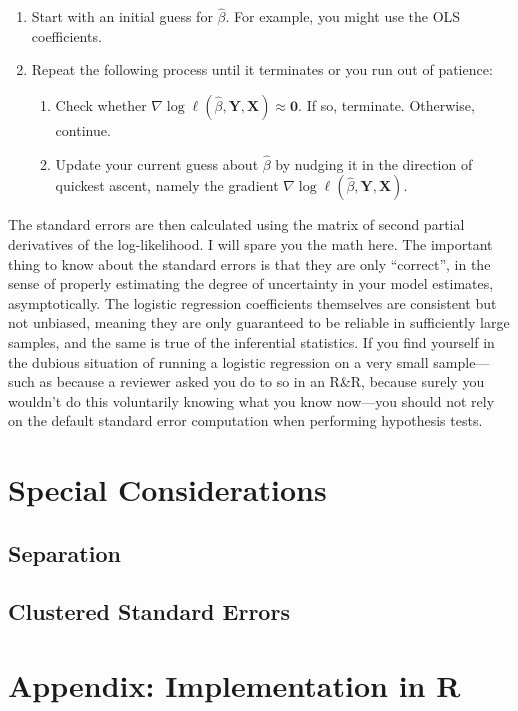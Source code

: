 \documentclass[
  12pt,
  oneside,openany]{book}
\begin{document}
\begin{enumerate}
\def\labelenumi{\arabic{enumi}.}
\item
  Start with an initial guess for \(\hat{\beta}\).
  For example, you might use the OLS coefficients.
\item
  Repeat the following process until it terminates or you run out of patience:

  \begin{enumerate}
  \def\labelenumii{\alph{enumii}.}
  \item
    Check whether \(\nabla \log \ell(\hat{\beta}, \mathbf{Y}, \mathbf{X}) \approx \mathbf{0}\). If so, terminate. Otherwise, continue.
  \item
    Update your current guess about \(\hat{\beta}\) by nudging it in the direction of quickest ascent, namely the gradient \(\nabla \log \ell(\hat{\beta}, \mathbf{Y}, \mathbf{X})\).
  \end{enumerate}
\end{enumerate}

The standard errors are then calculated using the matrix of second partial derivatives of the log-likelihood.
I will spare you the math here.
The important thing to know about the standard errors is that they are only ``correct'', in the sense of properly estimating the degree of uncertainty in your model estimates, asymptotically.
The logistic regression coefficients themselves are consistent but not unbiased, meaning they are only guaranteed to be reliable in sufficiently large samples, and the same is true of the inferential statistics.
If you find yourself in the dubious situation of running a logistic regression on a very small sample---such as because a reviewer asked you do to so in an R\&R, because surely you wouldn't do this voluntarily knowing what you know now---you should not rely on the default standard error computation when performing hypothesis tests.

\hypertarget{special-considerations}{%
\section{Special Considerations}\label{special-considerations}}

\hypertarget{separation}{%
\subsection{Separation}\label{separation}}

\hypertarget{clustered-standard-errors-1}{%
\subsection{Clustered Standard Errors}\label{clustered-standard-errors-1}}

\hypertarget{appendix-implementation-in-r-2}{%
\section{Appendix: Implementation in R}\label{appendix-implementation-in-r-2}}

  
\end{document}
